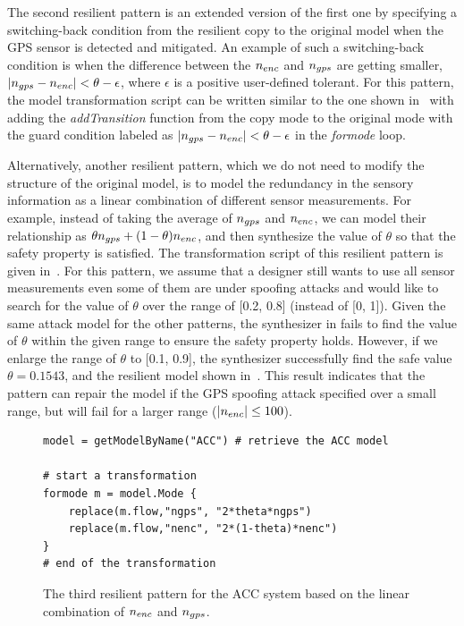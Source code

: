 The second resilient pattern is an extended version of the first one by specifying a switching-back condition from the resilient copy to the original model when the GPS sensor is detected and mitigated. An example of such a switching-back condition is when the difference between the $n_{enc}$ and $n_{gps}$ are getting smaller, \ie $|n_{gps} -n_{enc}| < \theta - \epsilon$, where $\epsilon$ is a positive user-defined tolerant. For this pattern, the model transformation script can be written similar to the one shown in~ with adding the \emph{addTransition} function from the copy mode to the original mode with the guard condition labeled as $|n_{gps} -n_{enc}| < \theta - \epsilon$ in the \emph{formode} loop.



Alternatively, another resilient pattern, which we do not need to modify the structure of the original model, is to model the redundancy in the sensory information as a linear combination of different sensor measurements. For example, instead of taking the average of $n_{gps}$ and $n_{enc}$, we can model their relationship as $\theta n_{gps} + (1-\theta)n_{enc}$, and then synthesize the value of $\theta$ so that the safety property is satisfied. The transformation script of this resilient pattern is given in~. For this pattern, we assume that a designer still wants to use all sensor measurements even some of them are under spoofing attacks and would like to search for the value of $\theta$ over the range of [0.2, 0.8] (instead of [0, 1]). Given the same attack model for the other patterns, the synthesizer in \toolreaffirm fails to find the value of $\theta$ within the given range to ensure the safety property holds. However, if we enlarge the range of $\theta$ to [0.1, 0.9], the synthesizer successfully find the safe value $\theta = 0.1543$, and the resilient model shown in~. 
%
This result indicates that the pattern can repair the model if the GPS spoofing attack specified over a small range, but will fail for a larger range (\eg $|n_{enc}| \leq 100$).           

\begin{figure}[!t]%
\begin{lstlisting}[basicstyle=\ttfamily\footnotesize, numbers=none]
model = getModelByName("ACC") # retrieve the ACC model

# start a transformation  
formode m = model.Mode {
    replace(m.flow,"ngps", "2*theta*ngps")
    replace(m.flow,"nenc", "2*(1-theta)*nenc")
}
# end of the transformation
\end{lstlisting}
\caption{The third resilient pattern for the ACC system based on the linear combination of $n_{enc}$ and $n_{gps}$.}%
%
\end{figure}


